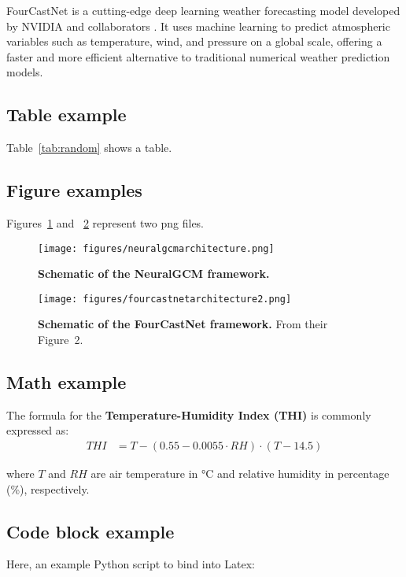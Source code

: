 FourCastNet is a cutting-edge deep learning weather forecasting model developed by NVIDIA and collaborators \cite{pathak2022fcastnet}. It uses machine learning to predict atmospheric variables such as temperature, wind, and pressure on a global scale, offering a faster and more efficient alternative to traditional numerical weather prediction models.


\subsection*{Table example}
Table~\ref{tab:random} shows a table.





\subsection*{Figure examples}
Figures~\ref{fig:NeuralGCM} and ~\ref{fig:fcastnet} represent two png files.

\begin{figure}[htbp]
    \centering
    \texttt{[image: figures/neuralgcmarchitecture.png]}
    \caption{\textbf{Schematic of the NeuralGCM framework.}}
    \label{fig:NeuralGCM}
\end{figure}



\begin{figure}[htbp]
    \centering
    \texttt{[image: figures/fourcastnetarchitecture2.png]}
    \caption{\textbf{Schematic of the FourCastNet framework.} From \cite{pathak2022fcastnet} their Figure~2. }
    \label{fig:fcastnet}
\end{figure}


\subsection*{Math example}
The formula for the \textbf{Temperature-Humidity Index (THI)} is commonly expressed as:
\begin{align}
    THI &= T - \left(0.55 - 0.0055 \cdot RH\right) \cdot \left(T - 14.5\right)
    \label{eq:HTI}
\end{align}

where $T$ and $RH$ are air temperature in °C and relative humidity in percentage (\%), respectively.


\subsection*{Code block example}
Here, an example Python script to bind into Latex:
